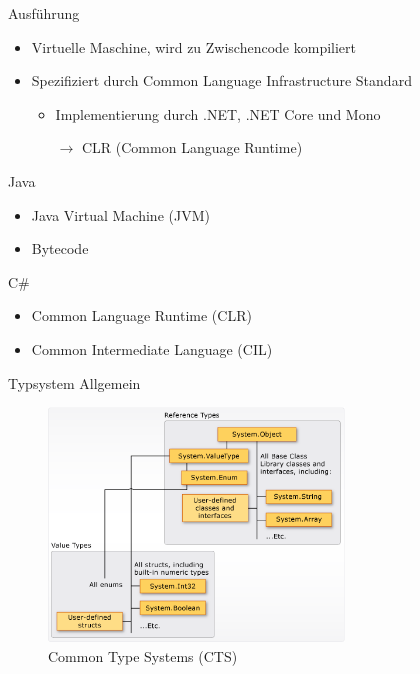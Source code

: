 \documentclass[11pt]{beamer}
\begin{document}
\begin{frame}{Ausführung}

	\begin{itemize}
		\item Virtuelle Maschine, wird zu Zwischencode kompiliert
		\item Spezifiziert durch  Common Language Infrastructure Standard
		\begin{itemize}
			\item Implementierung durch .NET, .NET Core und Mono 
			\item[$\rightarrow$] CLR (Common Language Runtime)
		\end{itemize}
	\end{itemize}
	
	\setlength{\columnseprule}{0.4pt}
	\begin{multicols}{2}
		Java \\
		\begin{itemize}
			\item Java Virtual Machine (JVM)
			\item Bytecode
		\end{itemize}

		\columnbreak

		C\#\\
		\begin{itemize}
			\item Common Language Runtime (CLR)
			\item Common Intermediate Language (CIL)
		\end{itemize}
	\end{multicols}
\end{frame}


\begin{frame}{Typsystem Allgemein}
	\begin{figure}
	\centering
		\includegraphics[width=0.7\textwidth]{bilder/value-reference-types-common-type-system.png}
		\caption{Common Type Systems (CTS) \cite{progrguide}}
	\end{figure}
\end{frame}
\end{document}
